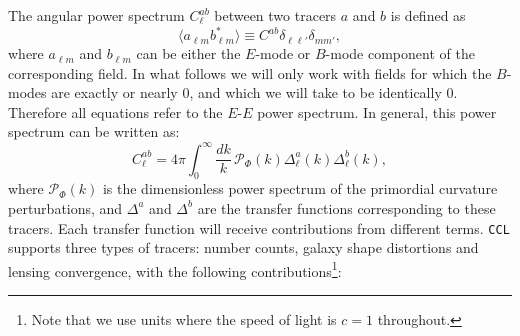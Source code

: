 \documentclass[\docopts]{\docclass}
\newcommand{\ccl}{{\tt CCL}\xspace}
\begin{document}
The angular power spectrum $C^{ab}_\ell$ between two tracers $a$ and $b$ is defined as
\begin{equation}
  \langle a_{\ell m}b^*_{\ell m}\rangle\equiv C^{ab}\delta_{\ell\ell'}\delta_{mm'},
  \label{eq:clgen}
\end{equation}
where $a_{\ell m}$ and $b_{\ell m}$ can be either the $E$-mode or $B$-mode component of the corresponding field. In what follows we will only work with fields for which the $B$-modes are exactly or nearly $0$, and which we will take to be identically $0$. Therefore all equations refer to the $E$-$E$ power spectrum. In general, this power spectrum can be written as:
\begin{equation}
  C^{ab}_\ell=4\pi\int_0^\infty \frac{dk}{k}\,\mathcal{P}_\Phi(k)\Delta^a_\ell(k)\Delta^b_\ell(k),
  \label{eq:cls}
\end{equation}
where $\mathcal{P}_\Phi(k)$ is the dimensionless power spectrum of the primordial curvature perturbations, and $\Delta^a$ and $\Delta^b$ are the transfer functions corresponding to these tracers. Each transfer function will receive contributions from different terms. \ccl supports three types of tracers: number counts, galaxy shape distortions and lensing convergence, with the following contributions\footnote{Note that we use units where the speed of light is $c=1$ throughout.}:
\end{document}
